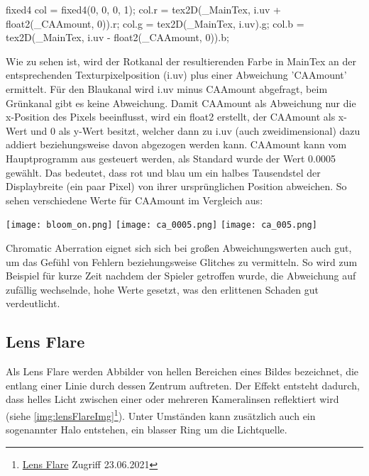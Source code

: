 \begin{hlsl}
    fixed4 col = fixed4(0, 0, 0, 1);
    col.r = tex2D(_MainTex, i.uv + float2(_CAAmount, 0)).r;
    col.g = tex2D(_MainTex, i.uv).g;
    col.b = tex2D(_MainTex, i.uv - float2(_CAAmount, 0)).b;
\end{hlsl}

Wie zu sehen ist, wird der Rotkanal der resultierenden Farbe in MainTex an der entsprechenden Texturpixelposition (i.uv) plus einer Abweichung 'CAAmount' ermittelt. Für den Blaukanal wird i.uv minus CAAmount abgefragt, beim Grünkanal gibt es keine Abweichung. Damit CAAmount als Abweichung nur die x-Position des Pixels beeinflusst, wird ein float2 erstellt, der CAAmount als x-Wert und 0 als y-Wert besitzt, welcher dann zu i.uv (auch zweidimensional) dazu addiert beziehungsweise davon abgezogen werden kann.
CAAmount kann vom Hauptprogramm aus gesteuert werden, als Standard wurde der Wert 0.0005 gewählt. Das bedeutet, dass rot und blau um ein halbes Tausendstel der Displaybreite (ein paar Pixel) von ihrer ursprünglichen Position abweichen. So sehen verschiedene Werte für CAAmount im Vergleich aus:

\captionsetup{type=figure}
\texttt{[image: bloom\_on.png]}
\texttt{[image: ca\_0005.png]}
\texttt{[image: ca\_005.png]}

Chromatic Aberration eignet sich sich bei gro{\ss}en Abweichungswerten auch gut, um das Gefühl von Fehlern beziehungsweise Glitches zu vermitteln. So wird zum Beispiel für kurze Zeit nachdem der Spieler getroffen wurde, die Abweichung auf zufällig wechselnde, hohe Werte gesetzt, was den erlittenen Schaden gut verdeutlicht.



\subsection{Lens Flare}

Als Lens Flare werden Abbilder von hellen Bereichen eines Bildes bezeichnet, die entlang einer Linie durch dessen Zentrum auftreten. Der Effekt entsteht dadurch, dass helles Licht zwischen einer oder mehreren Kameralinsen reflektiert wird (siehe \autoref{img:lensFlareImg}\footnote{\href{https://de.wikipedia.org/wiki/Lens_Flare}{Lens Flare} Zugriff 23.06.2021}). Unter Umständen kann zusätzlich auch ein sogenannter Halo entstehen, ein blasser Ring um die Lichtquelle.



